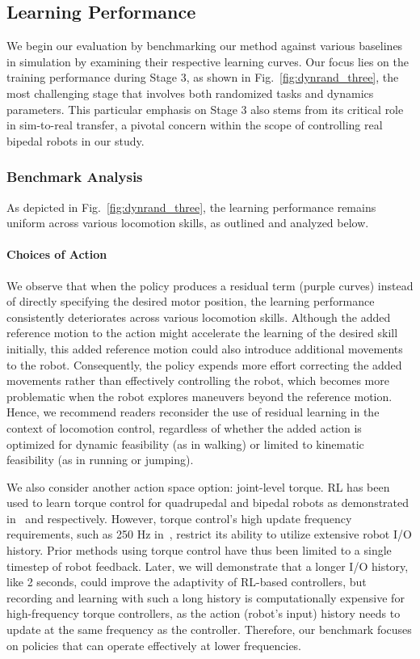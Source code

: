 \subsection{Learning Performance}



We begin our evaluation by benchmarking our method against various baselines in simulation by examining their respective learning curves. 
Our focus lies on the training performance during Stage 3, as shown in Fig.~\ref{fig:dynrand_three}, the most challenging stage that involves both randomized tasks and dynamics parameters. 
This particular emphasis on Stage 3 also stems from its critical role in sim-to-real transfer, a pivotal concern within the scope of controlling real bipedal robots in our study. 

\subsubsection{Benchmark Analysis}
As depicted in Fig.~\ref{fig:dynrand_three}, the learning performance remains uniform across various locomotion skills, as outlined and analyzed below. 

\paragraph{Choices of Action}
We observe that when the policy produces a residual term (purple curves) instead of directly specifying the desired motor position, the learning performance consistently deteriorates across various locomotion skills. 
Although the added reference motion to the action might accelerate the learning of the desired skill initially, this added reference motion could also introduce additional movements to the robot. 
Consequently, the policy expends more effort correcting the added movements rather than effectively controlling the robot, which becomes more problematic when the robot explores maneuvers beyond the reference motion. 
Hence, we recommend readers reconsider the use of residual learning in the context of locomotion control, regardless of whether the added action is optimized for dynamic feasibility (as in walking) or limited to kinematic feasibility (as in running or jumping).

We also consider another action space option: joint-level torque. RL has been used to learn torque control for quadrupedal and bipedal robots as demonstrated in~\cite{chen2022learning} and \cite{kim2023torque} respectively. However, torque control's high update frequency requirements, such as 250 Hz in~\cite{kim2023torque}, restrict its ability to utilize extensive robot I/O history. Prior methods using torque control have thus been limited to a single timestep of robot feedback. Later, we will demonstrate that a longer I/O history, like 2 seconds, could improve the adaptivity of RL-based controllers, but recording and learning with such a long history is computationally expensive for high-frequency torque controllers, as the action (robot's input) history needs to update at the same frequency as the controller. Therefore, our benchmark focuses on policies that can operate effectively at lower frequencies.



